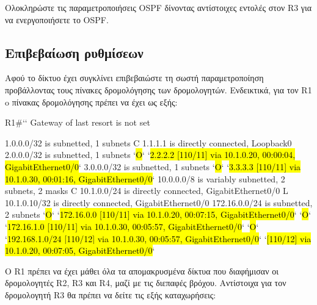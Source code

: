 \documentclass{EdipyLabs} %
\begin{document}
Ολοκληρώστε τις παραμετροποιήσεις OSPF δίνοντας αντίστοιχες εντολές στον R3 για να ενεργοποιήσετε το OSPF.

\subsection{Επιβεβαίωση ρυθμίσεων}
Αφού το δίκτυο έχει συγκλίνει επιβεβαιώστε τη σωστή παραμετροποίηση προβάλλοντας τους πίνακες δρομολόγησης των δρομολογητών. Ενδεικτικά, για τον R1 o πίνακας δρομολόγησης πρέπει να έχει ως εξής:

\begin{CommandBox}
R1#``
Gateway of last resort is not set

      1.0.0.0/32 is subnetted, 1 subnets
C        1.1.1.1 is directly connected, Loopback0
      2.0.0.0/32 is subnetted, 1 subnets
`\hl{O}`        `\hl{2.2.2.2 [110/11] via 10.1.0.20, 00:00:04, GigabitEthernet0/0}`
      3.0.0.0/32 is subnetted, 1 subnets
`\hl{O}`        `\hl{3.3.3.3 [110/11] via 10.1.0.30, 00:01:16, GigabitEthernet0/0}`
      10.0.0.0/8 is variably subnetted, 2 subnets, 2 masks
C        10.1.0.0/24 is directly connected, GigabitEthernet0/0
L        10.1.0.10/32 is directly connected, GigabitEthernet0/0
      172.16.0.0/24 is subnetted, 2 subnets
`\hl{O}`        `\hl{172.16.0.0 [110/11] via 10.1.0.20, 00:07:15, GigabitEthernet0/0}`
`\hl{O}`        `\hl{172.16.1.0 [110/11] via 10.1.0.30, 00:05:57, GigabitEthernet0/0}`
`\hl{O}`     `\hl{192.168.1.0/24 [110/12] via 10.1.0.30, 00:05:57, GigabitEthernet0/0}`
                     `\hl{[110/12] via 10.1.0.20, 00:07:05, GigabitEthernet0/0}`
\end{CommandBox}

O R1 πρέπει να έχει μάθει όλα τα απομακρυσμένα δίκτυα που διαφήμισαν οι δρομολογητές R2, R3 και R4, μαζί με τις διεπαφές βρόχου. Αντίστοιχα για τον δρομολογητή R3 θα πρέπει να δείτε τις εξής καταχωρήσεις:
\end{document}
